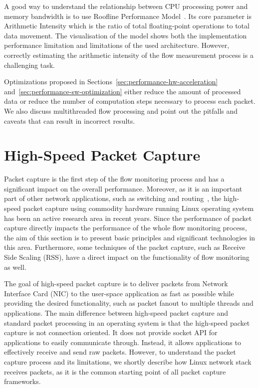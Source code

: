 A good way to understand the relationship between CPU processing power and memory bandwidth is to use Roofline Performance Model~\cite{Williams-2009-Roofline}. Its core parameter is Arithmetic Intensity which is the ratio of total floating-point operations to total data movement. The visualisation of the model shows both the implementation performance limitation and limitations of the used architecture. However, correctly estimating the arithmetic intensity of the flow measurement process is a challenging task.

Optimizations proposed in Sections~\ref{sec:performance-hw-acceleration} and~\ref{sec:performance-sw-optimization} either reduce the amount of processed data or reduce the number of computation steps necessary to process each packet. We also discuss multithreaded flow processing and point out the pitfalls and caveats that can result in incorrect results.


\section{High-Speed Packet Capture}\label{sec:performance-capture}

Packet capture is the first step of the flow monitoring process and has a significant impact on the overall performance. Moreover, as it is an important part of other network applications, such as switching and routing~\cite{Kawashima-2016-Host}, the high-speed packet capture using commodity hardware running Linux operating system has been an active research area in recent years. Since the performance of packet capture directly impacts the performance of the whole flow monitoring process, the aim of this section is to present basic principles and significant technologies in this area. Furthermore, some techniques of the packet capture, such as Receive Side Scaling (RSS), have a direct impact on the functionality of flow monitoring as well.

The goal of high-speed packet capture is to deliver packets from Network Interface Card (NIC) to the user-space application as fast as possible while providing the desired functionality, such as packet fanout to multiple threads and applications. The main difference between high-speed packet capture and standard packet processing in an operating system is that the high-speed packet capture is not connection oriented. It does not provide socket API for applications to easily communicate through. Instead, it allows applications to effectively receive and send raw packets. However, to understand the packet capture process and its limitations, we shortly describe how Linux network stack receives packets, as it is the common starting point of all packet capture frameworks.

